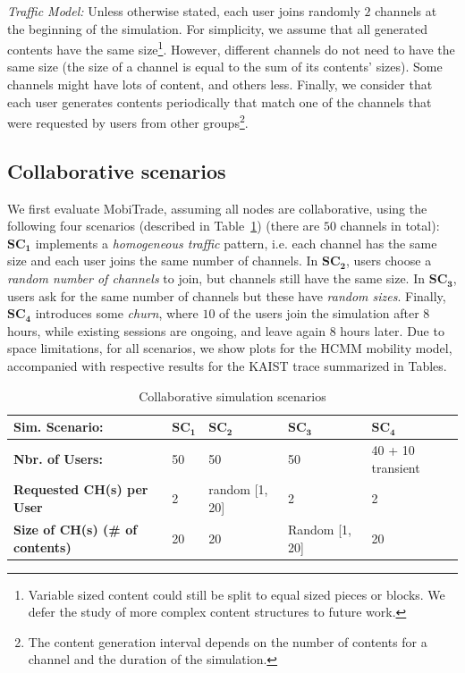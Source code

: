 \emph{Traffic Model:} Unless otherwise stated, each user joins randomly $2$ channels at the beginning of the simulation. For simplicity, we assume that all generated contents have the same size\footnote{Variable sized content could still be split to equal sized pieces or blocks. We defer the study of more complex content structures to future work.}. However, different channels do not need to have the same size (the size of a channel is equal to the sum of its contents' sizes). Some channels might have lots of content, and others less. Finally, we consider that each user generates contents periodically that match one of the channels that were requested by users from other groups\footnote{The content generation interval depends on the number of contents for a channel and the duration of the simulation.}.

\subsection{Collaborative scenarios}
\label{collaborative-scenario}

We first evaluate MobiTrade, assuming all nodes are collaborative, using the following four scenarios (described in Table~\ref{table:c-sim-sce}) (there are $50$ channels in total): {$\mathbf{SC_1}$} implements a \emph{homogeneous traffic} pattern, i.e. each channel has the same size and each user joins the same number of channels. In $\mathbf{SC_2}$, users choose a \emph{random number of channels} to join, but channels still have the same size. In $\mathbf{SC_3}$, users ask for the same number of channels but these have \emph{random sizes}. Finally, $\mathbf{SC_4}$ introduces some \emph{churn}, where $10$ of the users join the simulation after $8$ hours, while existing sessions are ongoing, and leave again $8$ hours later. Due to space limitations, for all scenarios, we show plots for the HCMM mobility model, accompanied with respective results for the KAIST trace summarized in Tables.

\begin{table}[!h]
\vspace{-0.1in}
\caption{Collaborative simulation scenarios}
\centering
\label{table:c-sim-sce}
\footnotesize
\begin{tabular}{|p{3cm}|p{2cm}|p{2cm}|p{2cm}|p{2cm}|}
\hline
\bfseries Sim. Scenario: & $\mathbf{SC_1}$ & $\mathbf{SC_2}$ & $\mathbf{SC_3}$&  $\mathbf{SC_4}$ \\
\hline
\bfseries Nbr. of Users: & 50 & 50 & 50 & 40 + 10 transient\\
\hline
\bfseries Requested CH(s) per User & 2 & random [1, 20]& 2& 2\\
\hline
\bfseries Size of CH(s) (\# of contents) &20  &20 &Random [1, 20]&20 \\
\hline
\end{tabular}
\end{table}

